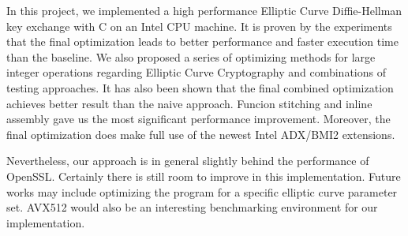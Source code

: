 In this project, we implemented a high performance Elliptic Curve Diffie-Hellman key exchange with C on an Intel CPU machine. It is proven by the experiments that the final optimization leads to better performance and faster execution time than the baseline. We also proposed a series of optimizing methods for large integer operations regarding Elliptic Curve Cryptography and combinations of testing approaches. It has also been shown that the final combined optimization achieves better result than the naive approach. Funcion stitching and inline assembly gave us the most significant performance improvement. Moreover, the final optimization does make full use of the newest Intel ADX/BMI2 extensions.

Nevertheless, our approach is in general slightly behind the performance of OpenSSL. Certainly there is still room to improve in this implementation. Future works may include optimizing the program for a specific elliptic curve parameter set. AVX512 would also be an interesting benchmarking environment for our implementation. 